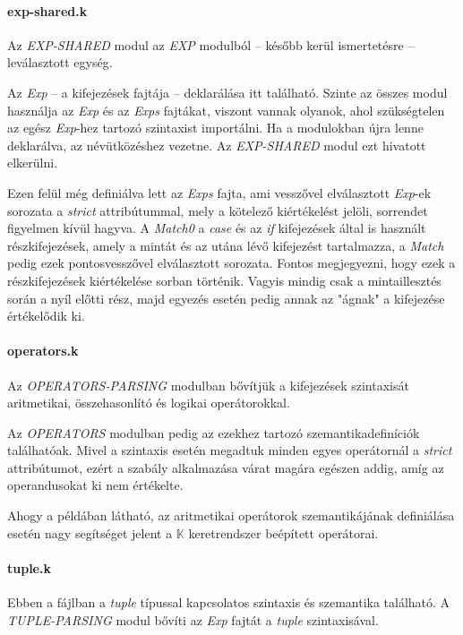 \paragraph{exp-shared.k}
Az \textit{EXP-SHARED} modul az \textit{EXP} modulból -- később kerül ismertetésre -- leválasztott egység.



Az \textit{Exp} -- a kifejezések fajtája -- deklarálása itt található. Szinte az összes modul használja az \textit{Exp} és az \textit{Exps} fajtákat, viszont vannak olyanok, ahol szükségtelen az egész \textit{Exp}-hez tartozó szintaxist importálni. Ha a modulokban újra lenne deklarálva, az névütközéshez vezetne. Az \textit{EXP-SHARED} modul ezt hivatott elkerülni.

Ezen felül még definiálva lett az \textit{Exps} fajta, ami vesszővel elválasztott \textit{Exp}-ek sorozata a \textit{strict} attribútummal, mely a kötelező kiértékelést jelöli, sorrendet figyelmen kívül hagyva. A \textit{Match0} a \textit{case} és az \textit{if} kifejezések által is használt részkifejezések, amely a mintát és az utána lévő kifejezést tartalmazza, a \textit{Match} pedig ezek pontosvesszővel elválasztott sorozata. Fontos megjegyezni, hogy ezek a részkifejezések kiértékelése sorban történik. Vagyis mindig csak a mintaillesztés során a nyíl előtti rész, majd egyezés esetén pedig annak az "ágnak" a kifejezése értékelődik ki.

\paragraph{operators.k}
Az \textit{OPERATORS-PARSING} modulban bővítjük a kifejezések szintaxisát aritmetikai, összehasonlító és logikai operátorokkal.



Az \textit{OPERATORS} modulban pedig az ezekhez tartozó szemantikadefiníciók találhatóak. Mivel a szintaxis esetén megadtuk minden egyes operátornál a \textit{strict} attribútumot, ezért a szabály alkalmazása várat magára egészen addig, amíg az operandusokat ki nem értékelte.



Ahogy a példában látható, az aritmetikai operátorok szemantikájának definiálása esetén nagy segítséget jelent a $\mathbb{K}$ keretrendszer beépített operátorai.

\paragraph{tuple.k}
Ebben a fájlban a \textit{tuple} típussal kapcsolatos szintaxis és szemantika található. A \textit{TUPLE-PARSING} modul bővíti az \textit{Exp} fajtát a \textit{tuple} szintaxisával.

